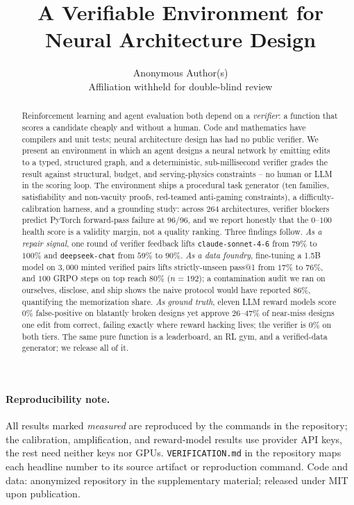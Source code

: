 \documentclass{article}
\title{A Verifiable Environment for Neural Architecture Design}
\author{Anonymous Author(s)\\ Affiliation withheld for double-blind review}
\date{}
\begin{document}
\maketitle

\begin{abstract}
Reinforcement learning and agent evaluation both depend on a \emph{verifier}: a function that scores a candidate cheaply and without a human. Code and mathematics have compilers and unit tests; neural architecture design has had no public verifier. We present an environment in which an agent designs a neural network by emitting edits to a typed, structured graph, and a deterministic, sub-millisecond verifier grades the result against structural, budget, and serving-physics constraints -- no human or LLM in the scoring loop. The environment ships a procedural task generator (ten families, satisfiability and non-vacuity proofs, red-teamed anti-gaming constraints), a difficulty-calibration harness, and a grounding study: across $264$ architectures, verifier blockers predict PyTorch forward-pass failure at $96/96$, and we report honestly that the $0$--$100$ health score is a validity margin, not a quality ranking. Three findings follow. \emph{As a repair signal}, one round of verifier feedback lifts \texttt{claude-sonnet-4-6} from $79\%$ to $100\%$ and \texttt{deepseek-chat} from $59\%$ to $90\%$. \emph{As a data foundry}, fine-tuning a 1.5B model on $3{,}000$ minted verified pairs lifts strictly-unseen pass@1 from $17\%$ to $76\%$, and $100$ GRPO steps on top reach $80\%$ ($n{=}192$); a contamination audit we ran on ourselves, disclose, and ship shows the naive protocol would have reported $86\%$, quantifying the memorization share. \emph{As ground truth}, eleven LLM reward models score $0\%$ false-positive on blatantly broken designs yet approve $26$--$47\%$ of near-miss designs one edit from correct, failing exactly where reward hacking lives; the verifier is $0\%$ on both tiers. The same pure function is a leaderboard, an RL gym, and a verified-data generator; we release all of it.
\end{abstract}

\paragraph{Reproducibility note.} All results marked \emph{measured} are reproduced by the commands in the repository; the calibration, amplification, and reward-model results use provider API keys, the rest need neither keys nor GPUs. \texttt{VERIFICATION.md} in the repository maps each headline number to its source artifact or reproduction command. Code and data: anonymized repository in the supplementary material; released under MIT upon publication.
\end{document}
